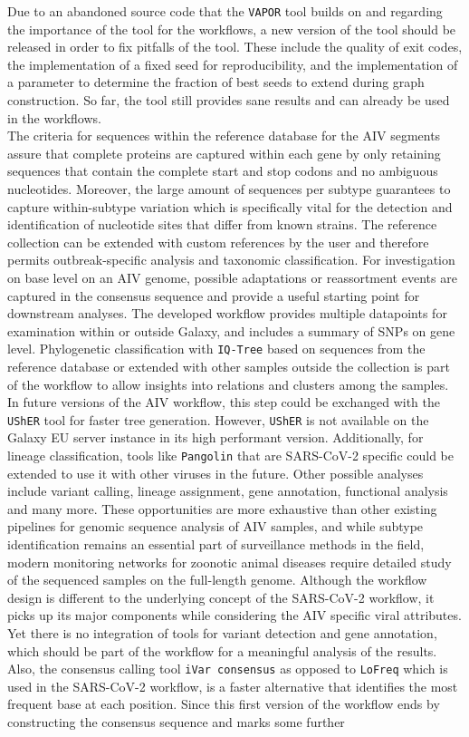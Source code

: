 Due to an abandoned source code that the \texttt{VAPOR} tool builds on and regarding the importance of the tool for the workflows, a new version of the tool should be released in order to fix pitfalls of the tool. These include the quality of exit codes, the implementation of a fixed seed for reproducibility, and the implementation of a parameter to determine the fraction of best seeds to extend during graph construction. So far, the tool still provides sane results and can already be used in the workflows.\\
The criteria for sequences within the reference database for the \ac{AIV} segments assure that complete proteins are captured within each gene by only retaining sequences that contain the complete start and stop codons and no ambiguous nucleotides. Moreover, the large amount of sequences per subtype guarantees to capture within-subtype variation which is specifically vital for the detection and identification of nucleotide sites that differ from known strains. The reference collection can be extended with custom references by the user and therefore permits outbreak-specific analysis and taxonomic classification. For investigation on base level on an \ac{AIV} genome, possible adaptations or reassortment events are captured in the consensus sequence and provide a useful starting point for downstream analyses. The developed workflow provides multiple datapoints for examination within or outside Galaxy, and includes a summary of \acp{SNP} on gene level. Phylogenetic classification with \texttt{IQ-Tree} based on sequences from the reference database or extended with other samples outside the collection is part of the workflow to allow insights into relations and clusters among the samples. In future versions of the \ac{AIV} workflow, this step could be exchanged with the \texttt{UShER} tool for faster tree generation. However, \texttt{UShER} is not available on the Galaxy EU server instance in its high performant version. Additionally, for lineage classification, tools like \texttt{Pangolin} that are \ac{SARS-CoV-2} specific could be extended to use it with other viruses in the future. Other possible analyses include variant calling, lineage assignment, gene annotation, functional analysis and many more. These opportunities are more exhaustive than other existing pipelines for genomic sequence analysis of \ac{AIV} samples, and while subtype identification remains an essential part of surveillance methods in the field, modern monitoring networks for zoonotic animal diseases require detailed study of the sequenced samples on the full-length genome. Although the workflow design is different to the underlying concept of the \ac{SARS-CoV-2} workflow, it picks up its major components while considering the \ac{AIV} specific viral attributes. Yet there is no integration of tools for variant detection and gene annotation, which should be part of the workflow for a meaningful analysis of the results. Also, the consensus calling tool \texttt{iVar consensus} as opposed to \texttt{LoFreq} which is used in the \ac{SARS-CoV-2} workflow, is a faster alternative that identifies the most frequent base at each position. Since this first version of the workflow ends by constructing the consensus sequence and marks some further 